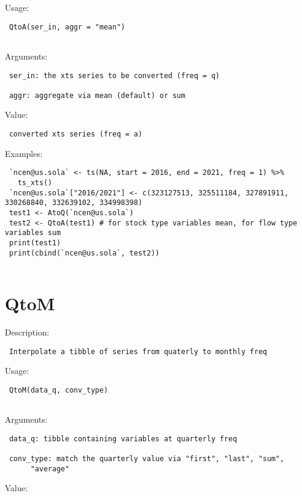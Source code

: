 \documentclass[
  letterpaper,
  DIV=11,
  numbers=noendperiod]{scrreport}
\begin{document}
Usage:

\begin{verbatim}
 QtoA(ser_in, aggr = "mean")
 
\end{verbatim}

Arguments:

\begin{verbatim}
 ser_in: the xts series to be converted (freq = q)

 aggr: aggregate via mean (default) or sum
\end{verbatim}

Value:

\begin{verbatim}
 converted xts series (freq = a)
\end{verbatim}

Examples:

\begin{verbatim}
 `ncen@us.sola` <- ts(NA, start = 2016, end = 2021, freq = 1) %>% 
   ts_xts()
 `ncen@us.sola`["2016/2021"] <- c(323127513, 325511184, 327891911, 330268840, 332639102, 334998398)
 test1 <- AtoQ(`ncen@us.sola`)
 test2 <- QtoA(test1) # for stock type variables mean, for flow type variables sum
 print(test1)
 print(cbind(`ncen@us.sola`, test2))
 
\end{verbatim}

\section{QtoM}\label{qtom}

Description:

\begin{verbatim}
 Interpolate a tibble of series from quaterly to monthly freq
\end{verbatim}

Usage:

\begin{verbatim}
 QtoM(data_q, conv_type)
 
\end{verbatim}

Arguments:

\begin{verbatim}
 data_q: tibble containing variables at quarterly freq

 conv_type: match the quarterly value via "first", "last", "sum",
      "average"
\end{verbatim}

Value:
\end{document}
